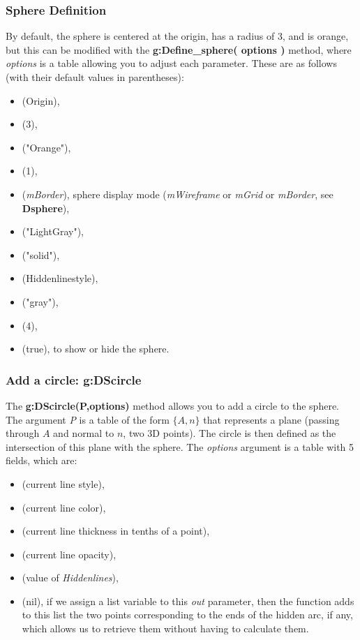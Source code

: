 \subsubsection{Sphere Definition}
By default, the sphere is centered at the origin, has a radius of $3$, and is orange, but this can be modified with the \textbf{g:Define\_sphere( options )} method, where \emph{options} is a table allowing you to adjust each parameter. These are as follows (with their default values ​​in parentheses):
\begin{itemize}
    \item {} (Origin),
    \item {} (3),
    \item {} ("Orange"),
    \item {} (1),
    \item {} (\emph{mBorder}), sphere display mode (\emph{mWireframe} or \emph{mGrid} or \emph{mBorder}, see \textbf{Dsphere}),
    \item {} ("LightGray"),
    \item {} ("solid"),
    \item {} (Hiddenlinestyle),
    \item {} ("gray"),
    \item {} (4),
    \item {} (true), to show or hide the sphere.
\end{itemize}

\subsubsection{Add a circle: g:DScircle}

The \textbf{g:DScircle(P,options)} method allows you to add a circle to the sphere. The argument \emph{P} is a table of the form $\{A,n\}$ that represents a plane (passing through $A$ and normal to $n$, two 3D points). The circle is then defined as the intersection of this plane with the sphere. The \emph{options} argument is a table with 5 fields, which are:
\begin{itemize}
    \item {} (current line style),
    \item {} (current line color),
    \item {} (current line thickness in tenths of a point),
    \item {} (current line opacity),
    \item {} (value of \emph{Hiddenlines}),
    \item {} (nil), if we assign a list variable to this \emph{out} parameter, then the function adds to this list the two points corresponding to the ends of the hidden arc, if any, which allows us to retrieve them without having to calculate them. \end{itemize}

